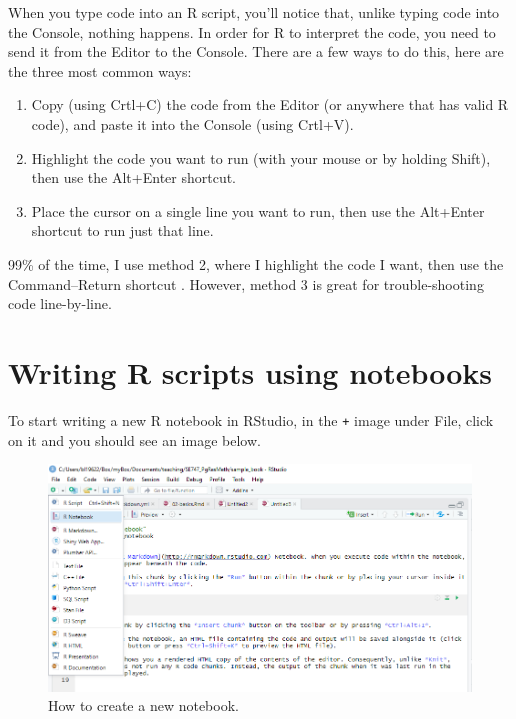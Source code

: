 \documentclass[
]{book}
\begin{document}
When you type code into an R script, you'll notice that, unlike typing code into the Console, nothing happens. In order for R to interpret the code, you need to send it from the Editor to the Console. There are a few ways to do this, here are the three most common ways:

\begin{enumerate}
\def\labelenumi{\arabic{enumi}.}
\item
  Copy (using Crtl+C) the code from the Editor (or anywhere that has valid R code), and paste it into the Console (using Crtl+V).
\item
  Highlight the code you want to run (with your mouse or by holding Shift), then use the Alt+Enter shortcut.
\item
  Place the cursor on a single line you want to run, then use the Alt+Enter shortcut to run just that line.
\end{enumerate}

99\% of the time, I use method 2, where I highlight the code I want, then use the Command--Return shortcut . However, method 3 is great for trouble-shooting code line-by-line.

\hypertarget{writing-r-scripts-using-notebooks}{%
\section{Writing R scripts using notebooks}\label{writing-r-scripts-using-notebooks}}

To start writing a new R notebook in RStudio, in the \texttt{+} image under File, click on it and you should see an image below.

\begin{figure}

{\centering \includegraphics[width=0.75\linewidth]{images/new_notebook} 

}

\caption{How to create a new notebook.}\label{fig:newnotebook}
\end{figure}
\end{document}
